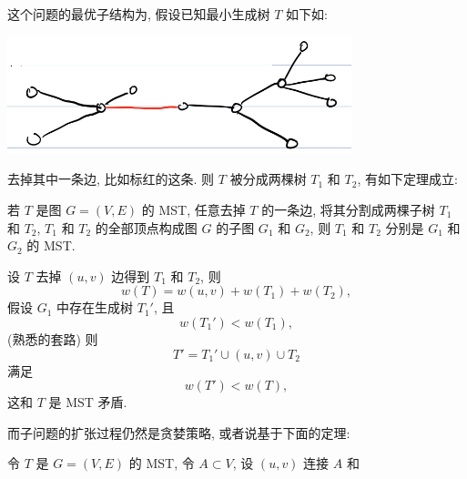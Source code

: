 \documentclass[a4paper]{ctexart}
\newcommand{\hl}[1]
{\noindent {\bf {#1}}}
\theoremstyle{definition}
\theoremstyle{definition}
\begin{document}
这个问题的最优子结构为, 假设已知最小生成树 $T$ 如下如: 
\begin{center}
  \includegraphics*[width=0.75\textwidth]{images/mst02.png}
  
\end{center}

去掉其中一条边, 比如标红的这条. 则 $T$ 被分成两棵树 $T_1$ 和 $T_2$, 有如下定理成立:

\hl{定理} 若 $T$ 是图 $G = (V, E)$ 的 MST, 任意去掉 $T$ 的一条边, 将其分割成两棵子树 $T_1$ 和 $T_2$,  
$T_1$ 和 $T_2$ 的全部顶点构成图 $G$ 的子图 $G_1$ 和 $G_2$, 则 $T_1$ 和 $T_2$ 分别是 $G_1$ 和 $G_2$ 的 MST.

\hl{证明} 设 $T$ 去掉 $(u, v)$ 边得到 $T_1$ 和 $T_2$, 则
$$
w(T) = w(u, v) + w(T_1) + w(T_2),
$$
假设 $G_1$ 中存在生成树 $T_1'$, 且 
$$
w(T_1') < w(T_1),
$$
(熟悉的套路) 则
$$
T' = T_1' \cup (u, v) \cup T_2
$$
满足
$$
w(T') < w(T),
$$
这和 $T$ 是 MST 矛盾.

而子问题的扩张过程仍然是贪婪策略, 或者说基于下面的定理:

\hl{定理} 令 $T$ 是 $G = (V, E)$ 的 MST, 令 $A \subset V$, 设 $(u, v)$ 连接 $A$ 和 



\end{document}
